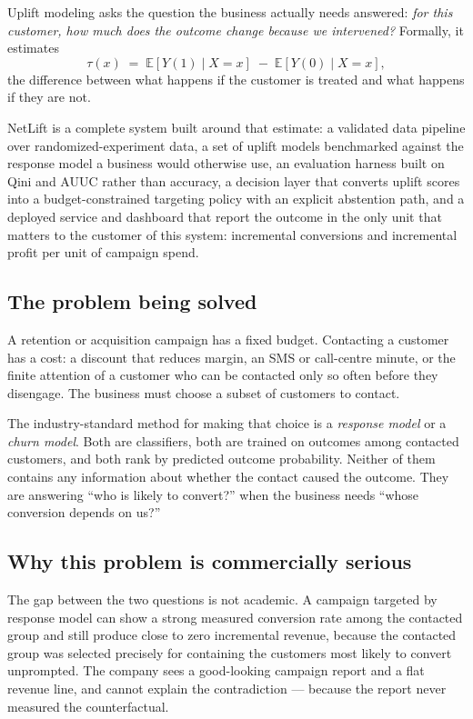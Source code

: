 \documentclass[11pt,a4paper]{article}
\begin{document}
Uplift modeling asks the question the business actually needs answered: \emph{for this customer,
how much does the outcome change because we intervened?} Formally, it estimates
\[
\tau(x) \;=\; \mathbb{E}\!\left[Y(1)\mid X = x\right] \;-\; \mathbb{E}\!\left[Y(0)\mid X = x\right],
\]
the difference between what happens if the customer is treated and what happens if they are not.

NetLift is a complete system built around that estimate: a validated data pipeline over
randomized-experiment data, a set of uplift models benchmarked against the response model a
business would otherwise use, an evaluation harness built on Qini and AUUC rather than accuracy,
a decision layer that converts uplift scores into a budget-constrained targeting policy with an
explicit abstention path, and a deployed service and dashboard that report the outcome in the
only unit that matters to the customer of this system: incremental conversions and incremental
profit per unit of campaign spend.

\subsection{The problem being solved}

A retention or acquisition campaign has a fixed budget. Contacting a customer has a cost:
a discount that reduces margin, an SMS or call-centre minute, or the finite attention of a
customer who can be contacted only so often before they disengage. The business must choose
a subset of customers to contact.

The industry-standard method for making that choice is a \emph{response model} or a \emph{churn
model}. Both are classifiers, both are trained on outcomes among contacted customers, and both
rank by predicted outcome probability. Neither of them contains any information about whether
the contact caused the outcome. They are answering ``who is likely to convert?'' when the
business needs ``whose conversion depends on us?''

\subsection{Why this problem is commercially serious}

The gap between the two questions is not academic. A campaign targeted by response model can
show a strong measured conversion rate among the contacted group and still produce close to zero
incremental revenue, because the contacted group was selected precisely for containing the
customers most likely to convert unprompted. The company sees a good-looking campaign report and
a flat revenue line, and cannot explain the contradiction --- because the report never measured
the counterfactual.
\end{document}
